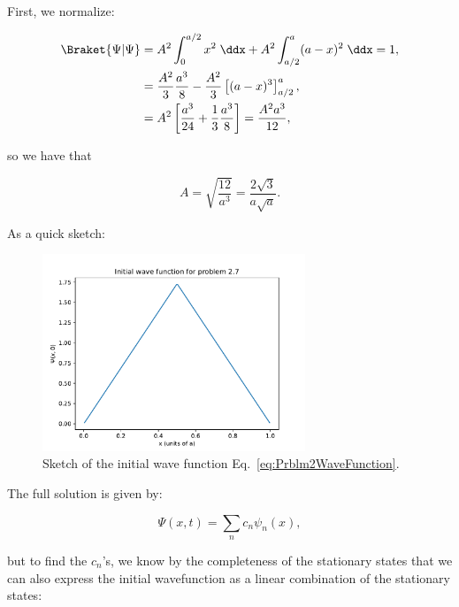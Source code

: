 \begin{parts}


\item First, we normalize:

\begin{align*}
    \Braket{\Psi | \Psi} &= A^2 \int_0^{a/2} x^2 \;\ddx + A^2 \int_{a/2}^a (a-x)^2\;\ddx = 1, \\
    &= \frac{A^2}{3}\frac{a^3}{8} - \frac{A^2}{3} \left[ (a-x)^3 \right]_{a/2}^{a}, \\
    &= A^2 \left[ \frac{a^3}{24} + \frac{1}{3}\frac{a^3}{8} \right] =  \frac{A^2a^3}{12}, \\
\end{align*}

so we have that

\begin{equation*}
    \boxed{A = \sqrt{\frac{12}{a^3}} = \frac{2\sqrt{3}}{a\sqrt{a}}.}
\end{equation*}

As a quick sketch:

\begin{figure}[ht]
    \centering
    \includegraphics[width=0.7\textwidth]{./res/Prblm2.pdf}
    \caption{Sketch of the initial wave function Eq.~\eqref{eq:Prblm2WaveFunction}.}
    \label{fig:Prblm2WaveFunction}
\end{figure}



\item The full solution is given by:

\begin{equation*}
    \Psi(x,t) = \sum_n c_n \psi_n(x),
\end{equation*}

but to find the $c_n$'s, we know by the completeness of the stationary states that we can also express the initial wavefunction as a linear combination of the stationary states:


\end{parts}
